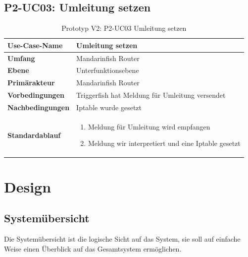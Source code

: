 \begin{table}[H]
\subsection{P2-UC03: Umleitung setzen}
    \centering
    \begin{tabularx}{\textwidth}{| l | p{} |}
        \hline
        \textbf{Use-Case-Name}     & \textbf{Umleitung setzen}    \\ \hline
        \textbf{Umfang}  & Mandarinfish Router     \\ \hline
        \textbf{Ebene} & Unterfunktionsebene   \\ \hline
        \textbf{Primärakteur} & Mandarinfish Router \\ \hline
        \textbf{Vorbedingungen} & Triggerfish hat Meldung für Umleitung versendet \\ \hline
        \textbf{Nachbedingungen} & Iptable wurde gesetzt \\ \hline
        \textbf{Standardablauf} & \begin{enumerate}
        	\item Meldung für Umleitung wird empfangen
        	\item Meldung wir interpretiert und eine Iptable gesetzt
        \end{enumerate} \\ \hline
    \end{tabularx}
    \caption{Prototyp V2: P2-UC03 Umleitung setzen}
\end{table}


\section{Design}

\subsection{Systemübersicht}
Die Systemübersicht ist die logische Sicht auf das System, sie soll auf einfache Weise einen Überblick auf das Gesamtsystem ermöglichen.

